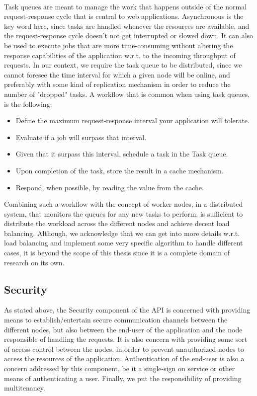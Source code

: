 \documentclass[11pt]{amsart}
\begin{document}
\begin{enumarate}
          \\ Task queues are meant to manage the work that happens outside of the normal
          request-response cycle that is central to web applications. Asynchronous is the
          key word here, since tasks are handled whenever the resources are available, and
          the request-response cycle doesn't not get interrupted or slowed down. It can
          also be used to execute jobs that are more time-consuming without altering the
          response capabilities of the application w.r.t. to the incoming throughput of
          requests. In our context, we require the task queue to be distributed, since we
          cannot foresee the time interval for which a given node will be online, and
          preferably with some kind of replication mechanism in order to reduce the number
          of "dropped" tasks. A workflow that is common when using task queues, is the
          following: 
          \begin{itemize}
          \item Define the maximum request-response interval your application will tolerate. 
          \item Evaluate if a job will surpass that interval.
          \item Given that it surpass this interval, schedule a task in the Task queue.
          \item Upon completion of the task, store the result in a cache mechanism.
          \item Respond, when possible, by reading the value from the cache.
          \end{itemize}
          Combining such a workflow with the concept of worker nodes, in a distributed
          system, that monitors the queues for any new tasks to perform, is sufficient to
          distribute the workload across the different nodes and achieve decent load
          balancing. Although, we acknowledge that we can get into more details
          w.r.t. load balancing and implement some very specific algorithm to handle
          different cases, it is beyond the scope of this thesis since it is a complete
          domain of research on its own.

          \subsection{Security}
          As stated above, the Security component of the API is concerned with providing
          means to establish/entertain secure communication channels between the different
          nodes, but also between the end-user of the application and the node responsible
          of handling the requests. It is also concern with providing some sort of access
          control between the nodes, in order to prevent unauthorized nodes to access the
          resources of the application. Authentication of the end-user is also a concern
          addressed by this component, be it a single-sign on service or other means of
          authenticating a user. Finally, we put the responsibility of providing
          multitenancy. 
          

\end{enumarate}
\end{document}
